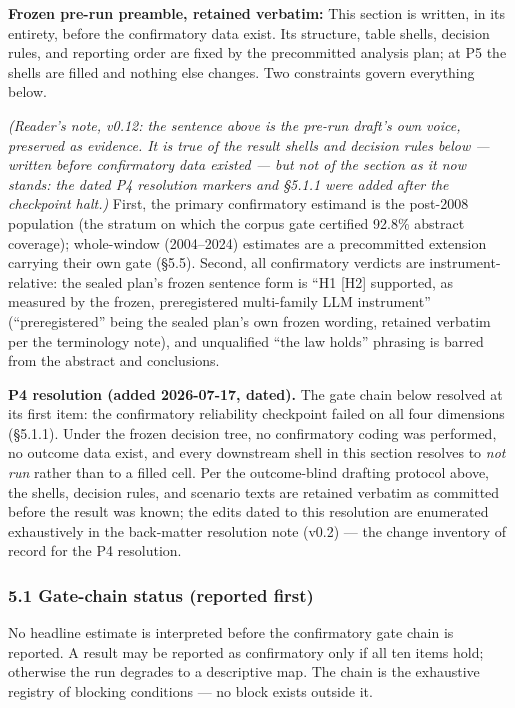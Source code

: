 \textbf{Frozen pre-run preamble, retained verbatim:} This section is written, in its entirety, before the confirmatory data exist. Its structure, table shells, decision rules, and reporting order are fixed by the precommitted analysis plan; at P5 the shells are filled and nothing else changes. Two constraints govern everything below.

\emph{(Reader's note, v0.12: the sentence above is the pre-run draft's own voice, preserved as evidence. It is true of the result shells and decision rules below --- written before confirmatory data existed --- but not of the section as it now stands: the dated P4 resolution markers and \S{}5.1.1 were added after the checkpoint halt.)} First, the primary confirmatory estimand is the post-2008 population (the stratum on which the corpus gate certified 92.8\% abstract coverage); whole-window (2004--2024) estimates are a precommitted extension carrying their own gate (\S{}5.5). Second, all confirmatory verdicts are instrument-relative: the sealed plan's frozen sentence form is ``H1 {[}H2{]} supported, as measured by the frozen, preregistered multi-family LLM instrument'' (``preregistered'' being the sealed plan's own frozen wording, retained verbatim per the terminology note), and unqualified ``the law holds'' phrasing is barred from the abstract and conclusions.

\textbf{P4 resolution (added 2026-07-17, dated).} The gate chain below resolved at its first item: the confirmatory reliability checkpoint failed on all four dimensions (\S{}5.1.1). Under the frozen decision tree, no confirmatory coding was performed, no outcome data exist, and every downstream shell in this section resolves to \emph{not run} rather than to a filled cell. Per the outcome-blind drafting protocol above, the shells, decision rules, and scenario texts are retained verbatim as committed before the result was known; the edits dated to this resolution are enumerated exhaustively in the back-matter resolution note (v0.2) --- the change inventory of record for the P4 resolution.

\subsubsection{5.1 Gate-chain status (reported first)}\label{gate-chain-status-reported-first}

No headline estimate is interpreted before the confirmatory gate chain is reported. A result may be reported as confirmatory only if all ten items hold; otherwise the run degrades to a descriptive map. The chain is the exhaustive registry of blocking conditions --- no block exists outside it.

